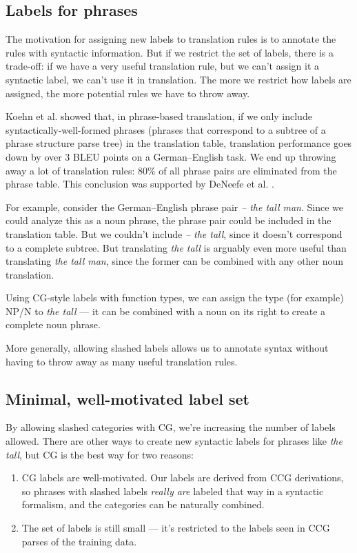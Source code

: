 \documentclass[a4paper]{article}
\begin{document}
\subsection{Labels for phrases}

The motivation for assigning new labels to translation rules is to annotate the rules with syntactic information. But if we restrict the set of labels, there is a trade-off: if we have a very useful translation rule, but we can't assign it a syntactic label, we can't use it in translation. The more we restrict how labels are assigned, the more potential rules we have to throw away.

Koehn et al.  showed that, in phrase-based translation, if we only include syntactically-well-formed phrases (phrases that correspond to a subtree of a phrase structure parse tree) in the translation table, translation performance goes down by over 3 BLEU points on a German--English task. We end up throwing away a lot of translation rules: 80\% of all phrase pairs are eliminated from the phrase table. This conclusion was supported by DeNeefe et al. .

For example, consider the German--English phrase pair {\em  -- the tall man}. Since we could analyze this as a noun phrase, the phrase pair could be included in the translation table. But we couldn't include {\em -- the tall}, since it doesn't correspond to a complete subtree. But translating {\em the tall} is arguably even more useful than translating {\em the tall man}, since the former can be combined with any other noun translation.

Using CG-style labels with function types, we can assign the type (for example) NP/N to {\em the tall} --- it can be combined with a noun on its right to create a complete noun phrase.

More generally, allowing slashed labels allows us to annotate syntax without having to throw away as many useful translation rules.

\subsection{Minimal, well-motivated label set}

By allowing slashed categories with CG, we're increasing the number of labels allowed. There are other ways to create new syntactic labels for phrases like {\em the tall}, but CG is the best way for two reasons:
\begin{enumerate}
\item CG labels are well-motivated. Our labels are derived from CCG derivations, so phrases with slashed labels {\em really are} labeled that way in a syntactic formalism, and the categories can be naturally combined.
\item The set of labels is still small --- it's restricted to the labels seen in CCG parses of the training data.
\end{enumerate}
\end{document}
